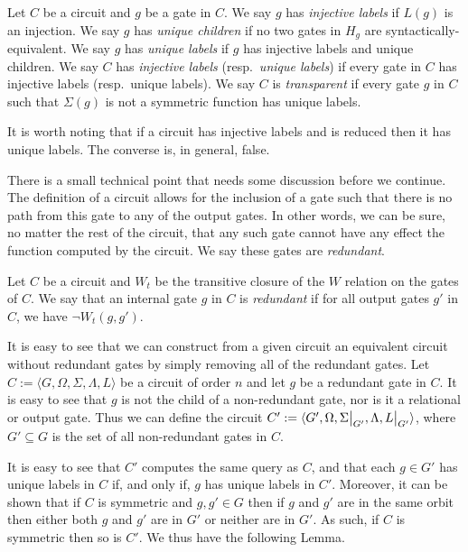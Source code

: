 \documentclass[../main/thesis.tex]{subfiles}
\begin{document}
\begin{definition}
  Let $C$ be a circuit and $g$ be a gate in $C$. We say $g$ has \emph{injective
    labels} if $L(g)$ is an injection. We say $g$ has \emph{unique children} if
  no two gates in $H_g$ are syntactically-equivalent. We say $g$ has
  \emph{unique labels} if $g$ has injective labels and unique children. We say
  $C$ has \emph{injective labels} (resp.\ \emph{unique labels}) if every gate in
  $C$ has injective labels (resp.\ unique labels). We say $C$ is
  \emph{transparent} if every gate $g$ in $C$ such that $\Sigma(g)$ is not a
  symmetric function has unique labels.
\end{definition}

It is worth noting that if a circuit has injective labels and is reduced then it
has unique labels. The converse is, in general, false.

There is a small technical point that needs some discussion before we continue.
The definition of a circuit allows for the inclusion of a gate such that there
is no path from this gate to any of the output gates. In other words, we can be
sure, no matter the rest of the circuit, that any such gate cannot have any
effect the function computed by the circuit. We say these gates are
\emph{redundant}.

\begin{definition}
  Let $C$ be a circuit and $W_t$ be the transitive closure of the $W$ relation
  on the gates of $C$. We say that an internal gate $g$ in $C$ is
  \emph{redundant} if for all output gates $g'$ in $C$, we have $\neg W_t (g,
  g')$.
\end{definition}

It is easy to see that we can construct from a given circuit an equivalent
circuit without redundant gates by simply removing all of the redundant gates.
Let $C := \langle G, \Omega, \Sigma, \Lambda, L \rangle$ be a circuit of order
$n$ and let $g$ be a redundant gate in $C$. It is easy to see that $g$ is not
the child of a non-redundant gate, nor is it a relational or output gate. Thus
we can define the circuit $C' := \langle G', \Omega, \restr{\Sigma}{G'},
\Lambda, \restr{L}{G'} \rangle$, where $G' \subseteq G$ is the set of all
non-redundant gates in $C$.

It is easy to see that $C'$ computes the same query as $C$, and that each $g \in
G'$ has unique labels in $C$ if, and only if, $g$ has unique labels in $C'$.
Moreover, it can be shown that if $C$ is symmetric and $g, g' \in G$ then if $g$
and $g'$ are in the same orbit then either both $g$ and $g'$ are in $G'$ or
neither are in $G'$. As such, if $C$ is symmetric then so is $C'$. We thus have
the following Lemma.
\end{document}
